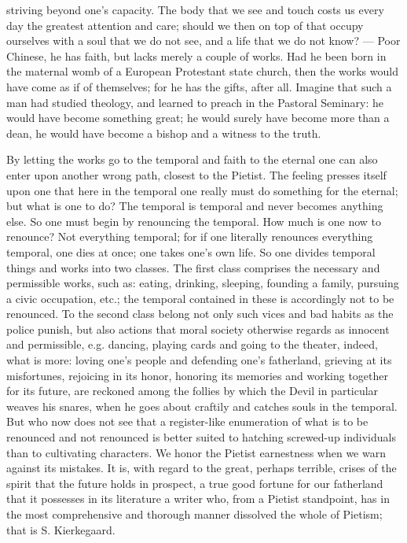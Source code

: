 \documentclass[12pt,a4paper,openany]{book}
\newcommand{\opage}[1]{\marginnote{\footnotesize\textit{[#1]}}}
\begin{document}
striving beyond one's capacity. The body that we see and
touch costs us every day the greatest attention and care;
should we then on top of that occupy ourselves with a soul that
we do not see, and a life that we do not know? --- Poor
Chinese, he has faith, but lacks merely a couple of works.
Had he been born in the maternal womb of a European Protestant
state church, then the works would have
come as if of themselves; for he has the gifts, after all.
Imagine that such a man had studied
\setcounter{footnote}{0}%
\opage{504}theology, and learned to preach in the Pastoral Seminary: he would have become something great; he would surely have become more than a dean,
he would have become a bishop and a witness to the truth.

By letting the works go to the temporal and
faith to the eternal one can also enter upon
another wrong path, closest to the Pietist. The feeling
presses itself upon one that here in the temporal one really must
do something for the eternal; but what is one to do?
The temporal is temporal and never becomes anything else. So
one must begin by renouncing the temporal. How much
is one now to renounce? Not everything temporal; for if
one literally renounces everything temporal, one dies
at once; one takes one's own life. So one divides
temporal things and works into two classes. The first
class comprises the necessary and permissible works,
such as: eating, drinking, sleeping, founding a family, pursuing a civic occupation, etc.; the temporal contained in these is
accordingly not to be renounced. To the second class belong not
only such vices and bad habits as the police punish,
but also actions that moral society otherwise
regards as innocent and permissible, e.g. dancing, playing
cards and going to the theater, indeed, what is more: loving
one's people and defending one's fatherland, grieving at its misfortunes,
rejoicing in its honor, honoring its memories and working
together for its future, are reckoned among the follies
by which the Devil in particular weaves his snares, when he goes about
craftily and catches souls in the temporal. But who now
does not see that a register-like enumeration of what is to be
renounced and not renounced is better suited to hatching
screwed-up individuals than to cultivating characters. We
honor the Pietist earnestness when we warn against its
\setcounter{footnote}{0}%
\opage{505}mistakes. It is, with regard to the great, perhaps terrible,
crises of the spirit that the future holds in prospect, a true
good fortune for our fatherland that it possesses in its literature a
writer who, from a Pietist standpoint, has in the
most comprehensive and thorough manner dissolved
the whole of Pietism; that is S. Kierkegaard.
\end{document}
